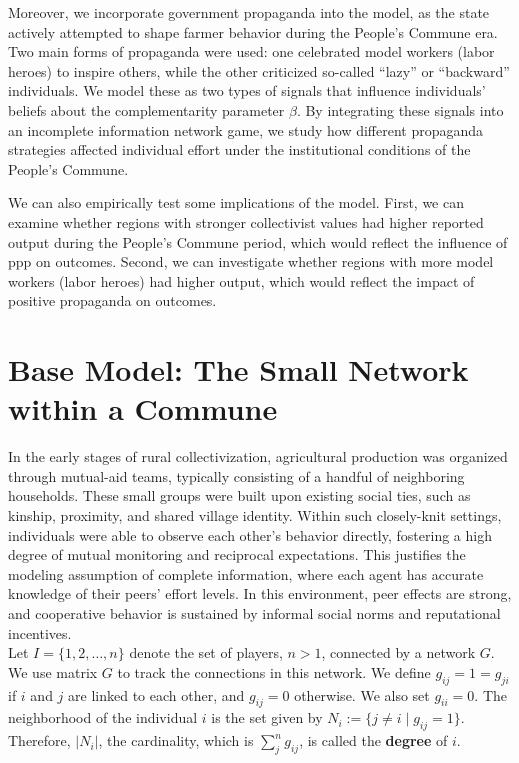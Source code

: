 \documentclass[12pt]{article}
\begin{document}
Moreover, we incorporate government propaganda into the model, as the state actively attempted to shape farmer behavior during the People's Commune era. Two main forms of propaganda were used: one celebrated model workers (labor heroes) to inspire others, while the other criticized so-called “lazy” or “backward” individuals. We model these as two types of signals that influence individuals' beliefs about the complementarity parameter $\beta$. By integrating these signals into an incomplete information network game, we study how different propaganda strategies affected individual effort under the institutional conditions of the People's Commune.

We can also empirically test some implications of the model. First, we can examine whether regions with stronger collectivist values had higher reported output during the People's Commune period, which would reflect the influence of ppp on outcomes. Second, we can investigate whether regions with more model workers (labor heroes) had higher output, which would reflect the impact of positive propaganda on outcomes.

\section{Base Model: The Small Network within a Commune}
In the early stages of rural collectivization, agricultural production was organized through mutual-aid teams, typically consisting of a handful of neighboring households. These small groups were built upon existing social ties, such as kinship, proximity, and shared village identity. Within such closely-knit settings, individuals were able to observe each other’s behavior directly, fostering a high degree of mutual monitoring and reciprocal expectations. This justifies the modeling assumption of complete information, where each agent has accurate knowledge of their peers’ effort levels. In this environment, peer effects are strong, and cooperative behavior is sustained by informal social norms and reputational incentives.\\

Let $I = \{1, 2, \dots, n\}$ denote the set of players, $n > 1$, connected by a network $G$. We use matrix $G$ to track the connections in this network. We define $g_{ij} = 1=g_{ji}$ if $i$ and $j$ are linked to each other, and $g_{ij} = 0$ otherwise.  We also set $g_{ii} = 0$. The neighborhood of the individual $i$ is the set given by $ N_i := \{j \ne i \mid g_{ij} = 1\}$. Therefore, $|N_i|$, the cardinality, which is $\sum_j^n g_{ij}$, is called the \textbf{degree} of $i$.\\
\end{document}
